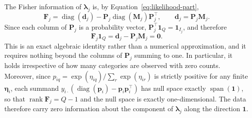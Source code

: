 The Fisher information of $\bm{\lambda}_j$ is, by Equation~\eqref{eq:likelihood-part},
\begin{equation}
    \mathbf{F}_{j}=\operatorname{diag}(\mathbf{d}_{j})-\mathbf{P}_{j}\operatorname{diag}(\mathbf{M}_{j})\mathbf{P}_{j}^{\top},
    \qquad \mathbf{d}_{j}=\mathbf{P}_{j}\mathbf{M}_{j} .
\end{equation}
Since each column of $\mathbf{P}_j$ is a probability vector, $\mathbf{P}_j^\top\mathbf{1}_Q=\mathbf{1}_{I_j}$, and therefore
\begin{equation}
    \mathbf{F}_{j}\mathbf{1}_{Q}=\mathbf{d}_{j}-\mathbf{P}_{j}\mathbf{M}_{j}=\mathbf{0} .
    \label{eq:F-singular}
\end{equation}
This is an exact algebraic identity rather than a numerical approximation, and it requires nothing beyond the columns of $\mathbf{P}_j$ summing to one. In particular, it holds irrespective of how many categories are observed with zero counts. Moreover, since $p_{iq}=\exp(\eta_{iq})/\sum_{r}\exp(\eta_{ir})$ is strictly positive for any finite $\bm{\eta}_i$, each summand $y_{i\cdot}(\operatorname{diag}(\bm{p}_i)-\bm{p}_i\bm{p}_i^\top)$ has null space exactly $\operatorname{span}(\mathbf{1})$, so that $\operatorname{rank}\mathbf{F}_j=Q-1$ and the null space is exactly one-dimensional. The data therefore carry zero information about the component of $\bm{\lambda}_j$ along the direction $\mathbf{1}$.

